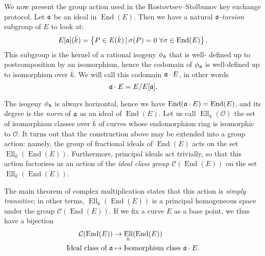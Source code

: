 \documentclass{article}
\newcommand{\Cl}{\mathcal{C}}
\renewcommand{\O}{\mathcal{O}}
\newcommand{\set}[1]{\left\{#1\right\}}
\newcommand{\suchthat}{\,|\,}
\DeclareMathOperator{\End}{End}
\DeclareMathOperator{\Ell}{Ell}
\begin{document}
We now present the group action used in the Rostovtsev--Stolbunov key exchange 
protocol. Let $\frak a$ be an ideal in $\End(E)$. Then we have a natural \emph
{${\frak a}$-torsion} subgroup of $E$ to look at:
\[
E[\frak a](\bar{k}) = \set{P\in E(\bar{k}) \suchthat \sigma(P) = 0\ 
\forall\sigma\in\End(E)}.
\]
This subgroup is the kernel of a rational isogeny $\phi_{\frak a}$ that is well-
defined up to postcomposition by an isomorphism, hence the codomain of $\phi_{
\frak a}$ is well-defined up to isomorphism over $\bar{k}$. We will call this 
codomain $\frak a\cdot E$, in other words
\[
\frak a\cdot E = E/E[\frak a].
\]

The isogeny $\phi_{\frak a}$ is always horizontal, hence we have $\End(\frak a
\cdot E) = \End(E)$, and its degree is the \emph{norm} of $\frak a$ as an ideal 
of $\End(E)$.
Let us call $\Ell_k(\O)$ the set of isomorphism classes over $\bar{k}$ of 
curves whose endomorphism ring is isomorphic to $\O$. It turns out that the 
construction above may be extended into a group action: namely, the group of 
fractional ideals of $\End(E)$ acts on the set $\Ell_k(\End(E))$. Furthermore, 
principal ideals act trivially, so that this action factorises as an action of 
the \emph{ideal class group} $\Cl(\End(E))$ on the set $\Ell_k(\End(E))$.

The main theorem of complex multiplication states that this action is \emph{
simply transitive}; in other terms, $\Ell_k(\End(E))$ is a principal 
homogeneous space under the group $\Cl(\End(E))$. If we fix a curve $E$ as a 
base point, we thus have a bijection
\[
\begin{aligned}
\Cl(\End(E)) &\to \Ell_k(\End(E)) \\
\text{Ideal class of }\frak a &\mapsto \text{Isomorphism class }\frak a\cdot E.
\end{aligned}
\]
\end{document}
